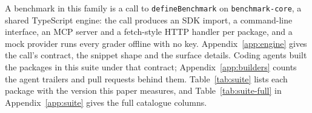 A benchmark in this family is a call to \texttt{defineBenchmark} on \texttt{benchmark-core}, a shared TypeScript engine: the call produces an SDK import, a command-line interface, an MCP server and a fetch-style HTTP handler per package, and a mock provider runs every grader offline with no key. Appendix~\ref{app:engine} gives the call's contract, the snippet shape and the surface details. Coding agents built the \suitePackages{} packages in this suite under that contract; Appendix~\ref{app:builders} counts the agent trailers and pull requests behind them. Table~\ref{tab:suite} lists each package with the version this paper measures, and Table~\ref{tab:suite-full} in Appendix~\ref{app:suite} gives the full catalogue columns.
